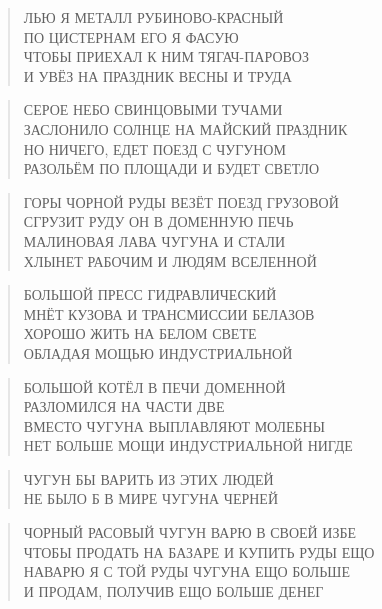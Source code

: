 \poemtitle{***}
\begin{verse}
ЛЬЮ Я МЕТАЛЛ РУБИНОВО-КРАСНЫЙ\\
ПО ЦИСТЕРНАМ ЕГО Я ФАСУЮ\\
ЧТОБЫ ПРИЕХАЛ К НИМ ТЯГАЧ-ПАРОВОЗ\\
И УВЁЗ НА ПРАЗДНИК ВЕСНЫ И ТРУДА
\end{verse}

\poemtitle{***}
\begin{verse}
СЕРОЕ НЕБО СВИНЦОВЫМИ ТУЧАМИ\\
ЗАСЛОНИЛО СОЛНЦЕ НА МАЙСКИЙ ПРАЗДНИК\\
НО НИЧЕГО, ЕДЕТ ПОЕЗД С ЧУГУНОМ\\
РАЗОЛЬЁМ ПО ПЛОЩАДИ И БУДЕТ СВЕТЛО
\end{verse}

\poemtitle{***}
\begin{verse}
ГОРЫ ЧОРНОЙ РУДЫ ВЕЗЁТ ПОЕЗД ГРУЗОВОЙ\\
СГРУЗИТ РУДУ ОН В ДОМЕННУЮ ПЕЧЬ\\
МАЛИНОВАЯ ЛАВА ЧУГУНА И СТАЛИ\\
ХЛЫНЕТ РАБОЧИМ И ЛЮДЯМ ВСЕЛЕННОЙ
\end{verse}

\poemtitle{***}
\begin{verse}
БОЛЬШОЙ ПРЕСС ГИДРАВЛИЧЕСКИЙ\\
МНЁТ КУЗОВА И ТРАНСМИССИИ БЕЛАЗОВ\\
ХОРОШО ЖИТЬ НА БЕЛОМ СВЕТЕ\\
ОБЛАДАЯ МОЩЬЮ ИНДУСТРИАЛЬНОЙ
\end{verse}

\poemtitle{***}
\begin{verse}
БОЛЬШОЙ КОТЁЛ В ПЕЧИ ДОМЕННОЙ\\
РАЗЛОМИЛСЯ НА ЧАСТИ ДВЕ\\
ВМЕСТО ЧУГУНА ВЫПЛАВЛЯЮТ МОЛЕБНЫ\\
НЕТ БОЛЬШЕ МОЩИ ИНДУСТРИАЛЬНОЙ НИГДЕ
\end{verse}

\poemtitle{***}
\begin{verse}
ЧУГУН БЫ ВАРИТЬ ИЗ ЭТИХ ЛЮДЕЙ\\
НЕ БЫЛО Б В МИРЕ ЧУГУНА ЧЕРНЕЙ
\end{verse}

\poemtitle{***}
\begin{verse}
ЧОРНЫЙ РАСОВЫЙ ЧУГУН ВАРЮ В СВОЕЙ ИЗБЕ\\
ЧТОБЫ ПРОДАТЬ НА БАЗАРЕ И КУПИТЬ РУДЫ ЕЩО\\
НАВАРЮ Я С ТОЙ РУДЫ ЧУГУНА ЕЩО БОЛЬШЕ\\
И ПРОДАМ, ПОЛУЧИВ ЕЩО БОЛЬШЕ ДЕНЕГ
\end{verse}

